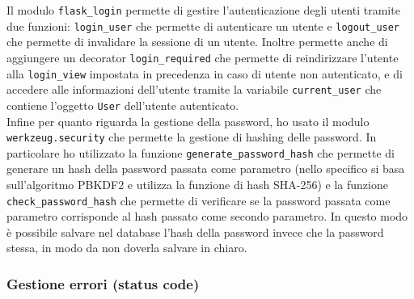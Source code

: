 \documentclass[12pt]{article}
\def\code#1{\texttt{#1}}
\begin{document}
\vskip 0.3cm
\noindent
Il modulo \code{flask\_login} permette di gestire l'autenticazione degli utenti tramite due funzioni: \code{login\_user} che permette di autenticare un utente e \code{logout\_user} che permette di invalidare la sessione di un utente. Inoltre permette anche di aggiungere un decorator \code{login\_required} che permette di reindirizzare l'utente alla \code{login\_view} impostata in precedenza in caso di utente non autenticato, e di accedere alle informazioni dell'utente tramite la variabile \code{current\_user} che contiene l'oggetto \code{User} dell'utente autenticato. \\
Infine per quanto riguarda la gestione della password, ho usato il modulo \code{werkzeug.security} che permette la gestione di hashing delle password. In particolare ho utilizzato la funzione \code{generate\_password\_hash} che permette di generare un hash della password passata come parametro (nello specifico si basa sull'algoritmo PBKDF2 e utilizza la funzione di hash SHA-256) e la funzione \code{check\_password\_hash} che permette di verificare se la password passata come parametro corrisponde al hash passato come secondo parametro. In questo modo è possibile salvare nel database l'hash della password invece che la password stessa, in modo da non doverla salvare in chiaro.
\vskip 1.5cm

\subsubsection{Gestione errori (status code)}
\end{document}
